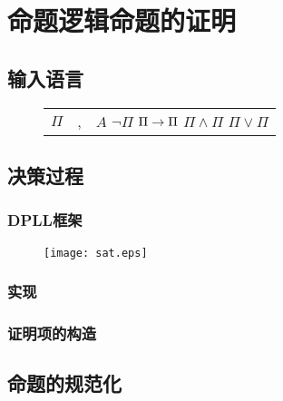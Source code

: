 \chapter{命题逻辑命题的证明}
\label{chap:sat}

\section{输入语言}
\begin{figure}[!htbp]
  \centering
  \begin{tabular}[rcl]{rcl}
    $\Pi$ & \sep{} & $A$ \deli{} $\lnot \Pi$ \deli{} $\Pi \rightarrow \Pi$ \deli{} $\Pi \land \Pi$ \deli{} $\Pi \lor \Pi$ \\
  \end{tabular}
\end{figure}

\section{决策过程}
\subsection{DPLL框架}
\begin{figure}[!htbp]
  \centering
  \texttt{[image: sat.eps]}
\end{figure}
\subsection{实现}
\subsection{证明项的构造}

\section{命题的规范化}
